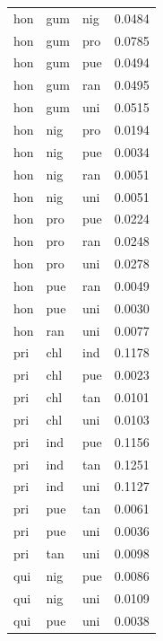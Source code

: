 \begin{tabular}{lllr}
hon & gum & nig & 0.0484\\
hon & gum & pro & 0.0785\\
\addlinespace
hon & gum & pue & 0.0494\\
hon & gum & ran & 0.0495\\
hon & gum & uni & 0.0515\\
hon & nig & pro & 0.0194\\
hon & nig & pue & 0.0034\\
\addlinespace
hon & nig & ran & 0.0051\\
hon & nig & uni & 0.0051\\
hon & pro & pue & 0.0224\\
hon & pro & ran & 0.0248\\
hon & pro & uni & 0.0278\\
\addlinespace
hon & pue & ran & 0.0049\\
hon & pue & uni & 0.0030\\
hon & ran & uni & 0.0077\\
pri & chl & ind & 0.1178\\
pri & chl & pue & 0.0023\\
\addlinespace
pri & chl & tan & 0.0101\\
pri & chl & uni & 0.0103\\
pri & ind & pue & 0.1156\\
pri & ind & tan & 0.1251\\
pri & ind & uni & 0.1127\\
\addlinespace
pri & pue & tan & 0.0061\\
pri & pue & uni & 0.0036\\
pri & tan & uni & 0.0098\\
qui & nig & pue & 0.0086\\
qui & nig & uni & 0.0109\\
\addlinespace
qui & pue & uni & 0.0038\\
\bottomrule
\end{tabular}

